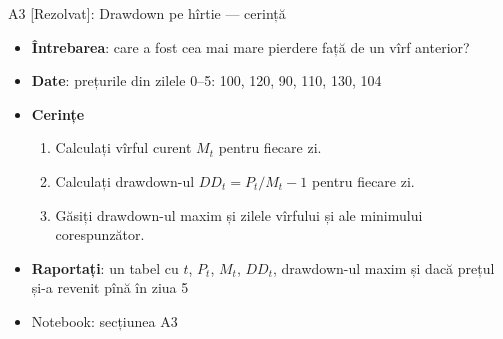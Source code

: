 \begin{frame}{A3 [Rezolvat]: Drawdown pe hîrtie --- cerință}
\itemsize{\small}
\begin{itemize}
\item \textbf{Întrebarea}: care a fost cea mai mare pierdere față de un vîrf anterior?
\item \textbf{Date}: prețurile din zilele 0--5: 100, 120, 90, 110, 130, 104
\item \textbf{Cerințe}
\begin{enumerate}
    \item Calculați vîrful curent $M_t$ pentru fiecare zi.
    \item Calculați drawdown-ul $DD_t = P_t / M_t - 1$ pentru fiecare zi.
    \item Găsiți drawdown-ul maxim și zilele vîrfului și ale minimului corespunzător.
\end{enumerate}
\item \textbf{Raportați}: un tabel cu $t$, $P_t$, $M_t$, $DD_t$, drawdown-ul maxim și dacă prețul și-a revenit pînă în ziua 5
\item Notebook: secțiunea A3
\end{itemize}
\end{frame}


